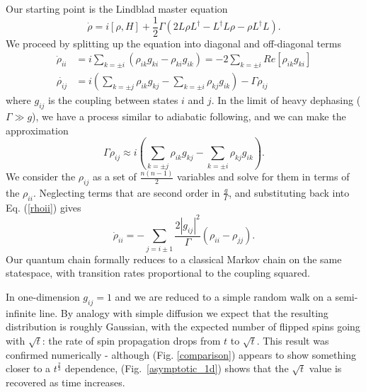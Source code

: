 Our starting point is the Lindblad master equation
\begin{equation}
  \dot{\rho}=i\left[\rho,H\right]+\frac{1}{2}\Gamma\left(2L\rho
  L^{\dagger}-L^{\dagger}L\rho-\rho L^{\dagger}L\right).
\end{equation}
We proceed by splitting up the equation into diagonal and off-diagonal terms
\begin{align}
  \dot{\rho}_{ii} & = i\sum_{k=\pm i}\left(\rho_{ik}g_{ki}-\rho_{ki}g_{ik}\right)=-2\sum_{k=\pm i}Re\left[\rho_{ik}g_{ki}\right] \label{rhoii}\\
  \dot{\rho_{ij}} & = i\left(\sum_{k=\pm j}\rho_{ik}g_{kj}-\sum_{k=\pm i}\rho_{kj}g_{ik}\right)-\Gamma\rho_{ij}
\end{align}
where $g_{ij}$ is the coupling between states $i$ and $j$. In the limit of heavy dephasing ($\Gamma\gg g$), we have a process similar to adiabatic following, and we can make the approximation\[ \Gamma\rho_{ij}\approx i\left(\sum_{k=\pm j}\rho_{ik}g_{kj}-\sum_{k=\pm i}\rho_{kj}g_{ik}\right).\] We consider the $\rho_{ij}$ as a set of $\frac{n(n-1)}{2}$ variables and solve for them in terms of the $\rho_{ii}$. Neglecting terms that are second order in $\frac{g}{\Gamma}$, and substituting back into Eq. (\ref{rhoii}) gives \[ \dot{\rho}_{ii}=-\sum_{j=i\pm1}\frac{2|g_{ij}|^{2}}{\Gamma}\left(\rho_{ii}-\rho_{jj}\right).\]
Our quantum chain formally reduces to a classical Markov chain on the same statespace, with transition rates proportional to the coupling squared. 

In one-dimension $g_{ij} = 1$ and we are reduced to a simple random walk on a semi-infinite line. By analogy with simple diffusion we expect that the resulting distribution is roughly Gaussian, with the expected number of flipped spins going with $\sqrt{t}$: the rate of spin propagation drops from $t$ to $\sqrt{t}$. This result was confirmed numerically - although (Fig. \ref{comparison}) appears to show something closer to a $t^\frac{2}{3}$ dependence, (Fig.~\ref{asymptotic_1d}) shows that the $\sqrt{t}$ value is recovered as time increases.

